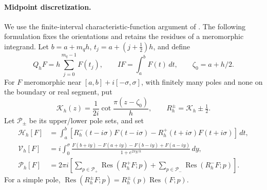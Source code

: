 \paragraph{Midpoint discretization.}
We use the finite-interval characteristic-function argument of
\cite[Secs.~4--5]{JavedTrefethen2014}. The following formulation fixes the
orientations and retains the residues of a meromorphic integrand.
Let $b=a+m_qh$, $t_j=a+(j+\tfrac12)h$, and define
\[
 Q_hF=h\sum_{j=0}^{m_q-1}F(t_j),\qquad IF=\int_a^bF(t)\,dt,
 \qquad \zeta_0=a+h/2.
\]
For $F$ meromorphic near $[a,b]+i[-\sigma,\sigma]$, with finitely many poles
and none on the boundary or real segment, put
\begin{equation}
 \mathcal K_h(z)=\frac1{2i}\cot\frac{\pi(z-\zeta_0)}h,
 \qquad R_h^\pm=\mathcal K_h\pm\tfrac12.
 \label{eq:characteristic}
\end{equation}
Let $\mathcal P_\pm$ be its upper/lower pole sets, and set
\begin{align}
 \mathcal H_h[F]&=\int_a^b
 [R_h^-(t-i\sigma)F(t-i\sigma)-R_h^+(t+i\sigma)F(t+i\sigma)]\,dt,
 \label{eq:Hquad}\\
 \mathcal V_h[F]&=i\int_0^\sigma
 \frac{F(b+iy)-F(a+iy)-F(b-iy)+F(a-iy)}{1+e^{2\pi y/h}}\,dy,
 \label{eq:Vquad}\\
 \mathcal P_h[F]&=2\pi i\left[
 \sum_{p\in\mathcal P_+}\operatorname{Res}(R_h^+F;p)
 +\sum_{p\in\mathcal P_-}\operatorname{Res}(R_h^-F;p)\right].
 \label{eq:Pquad}
\end{align}
For a simple pole, $\operatorname{Res}(R_h^\pm F;p)
=R_h^\pm(p)\operatorname{Res}(F;p)$.

